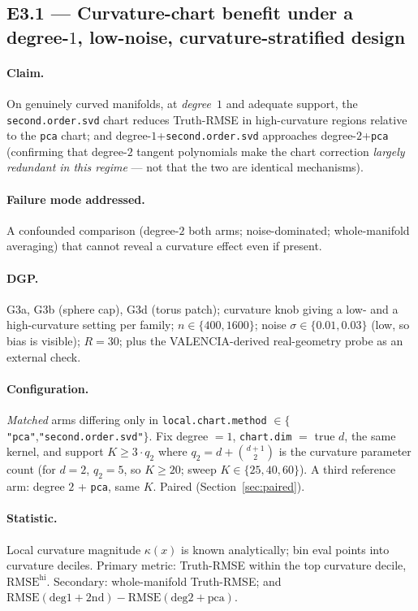 \documentclass[11pt]{article}
\newcommand{\code}[1]{\texttt{#1}}
\newcommand{\rmse}{\mathrm{RMSE}}
\begin{document}
\subsection{E3.1 — Curvature-chart benefit under a degree-$1$, low-noise, curvature-stratified design}

\paragraph{Claim.} On genuinely curved manifolds, at \emph{degree~$1$} and adequate support, the
\code{second.order.svd} chart reduces Truth-RMSE in high-curvature regions relative to the
\code{pca} chart; and degree-$1$+\code{second.order.svd} approaches degree-$2$+\code{pca}
(confirming that degree-$2$ tangent polynomials make the chart correction \emph{largely redundant
in this regime} --- not that the two are identical mechanisms).

\paragraph{Failure mode addressed.} A confounded comparison (degree-$2$ both arms; noise-dominated;
whole-manifold averaging) that cannot reveal a curvature effect even if present.

\paragraph{DGP.} G3a, G3b (sphere cap), G3d (torus patch); curvature knob giving a low- and a
high-curvature setting per family; $n\in\{400,1600\}$; noise $\sigma\in\{0.01,0.03\}$ (low, so
bias is visible); $R=30$; plus the VALENCIA-derived real-geometry probe as an external check.

\paragraph{Configuration.} \emph{Matched} arms differing only in \code{local.chart.method}
$\in\{$\code{"pca"},\code{"second.order.svd"}$\}$. Fix degree $=1$, \code{chart.dim} $=$ true $d$,
the same kernel, and support $K\ge 3\cdot q_2$ where $q_2=d+\binom{d+1}{2}$ is the curvature
parameter count (for $d=2$, $q_2=5$, so $K\ge 20$; sweep $K\in\{25,40,60\}$). A third reference
arm: degree $2$ + \code{pca}, same $K$. Paired (Section~\ref{sec:paired}).

\paragraph{Statistic.} Local curvature magnitude $\kappa(x)$ is known analytically; bin eval
points into curvature deciles. Primary metric: Truth-RMSE within the top curvature decile,
$\rmse^{\mathrm{hi}}$. Secondary: whole-manifold Truth-RMSE; and
$\rmse(\text{deg1}+\text{2nd})-\rmse(\text{deg2}+\text{pca})$.
\end{document}
